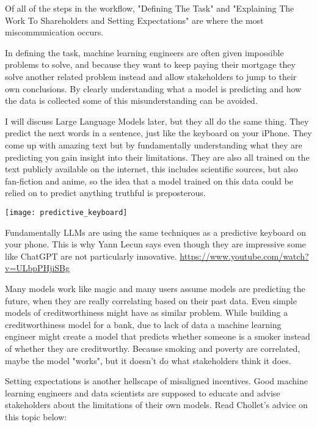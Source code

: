 Of all of the steps in the workflow, "Defining The Task" and "Explaining The Work To Shareholders and Setting Expectations" are where the most miscommunication occurs. 

In defining the task, machine learning engineers are often given impossible problems to solve, and because they want to keep paying their mortgage they solve another related problem instead and allow stakeholders to jump to their own conclusions. By clearly understanding what a model is predicting and how the data is collected some of this misunderstanding can be avoided.

I will discuss Large Language Models later, but they all do the same thing. They predict the next words in a sentence, just like the keyboard on your iPhone. They come up with amazing text but by fundamentally understanding what they are predicting you gain insight into their limitations. They are also all trained on the text publicly available on the internet, this includes scientific sources, but also fan-fiction and anime, so the idea that a model trained on this data could be relied on to predict anything truthful is preposterous. 

\begin{marginfigure}[-5.5cm]
        \texttt{[image: predictive\_keyboard]}
        \caption{Fundamentally LLMs are using the same techniques as a predictive keyboard on your phone. This is why Yann Lecun says even though they are impressive some like ChatGPT are not particularly innovative. \url{https://www.youtube.com/watch?v=ULbpPHjiSBg}}
\end{marginfigure}

Many models work like magic and many users assume models are predicting the future, when they are really correlating based on their past data. Even simple models of creditworthiness might have as similar problem. While building a creditworthiness model for a bank, due to lack of data a machine learning engineer might create a model that predicts whether someone is a smoker instead of whether they are creditworthy. Because smoking and poverty are correlated, maybe the model "works", but it doesn't do what stakeholders think it does. 

Setting expectations is another hellscape of misaligned incentives. Good machine learning engineers and data scientists are supposed to educate and advise stakeholders about the limitations of their own models. Read Chollet's advice on this topic below:

